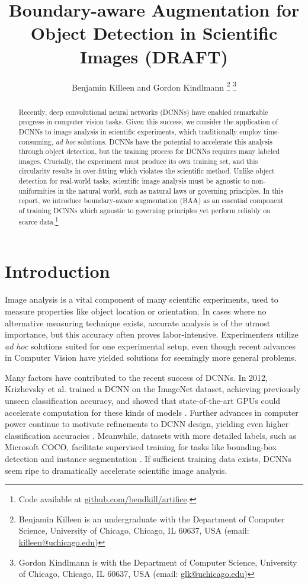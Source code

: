\documentclass[10pt, journal]{IEEEtran}
\title{Boundary-aware Augmentation for Object Detection in Scientific Images
  (DRAFT)}
\author{Benjamin Killeen and Gordon Kindlmann %
  \thanks{Benjamin Killeen is an undergraduate with the Department of Computer
    Science, University of Chicago, Chicago, IL 60637, USA (email:
    \href{mailto:killeen@uchicago.edu}{killeen@uchicago.edu})} %
  \thanks{Gordon Kindlmann is with the Department of Computer Science, 
    University of Chicago, Chicago, IL 60637, USA (email:
    \href{mailto:glk@uchicago.edu}{glk@uchicago.edu})} %
}
\begin{document}
\maketitle

\begin{abstract}
  Recently, deep convolutional neural networks (DCNNs) have enabled remarkable
  progress in computer vision tasks. Given this success, we consider the
  application of DCNNs to image analysis in scientific experiments, which
  traditionally employ time-consuming, \emph{ad hoc} solutions. DCNNs have the
  potential to accelerate this analysis through object detection, but the
  training process for DCNNs requires many labeled images. Crucially, the
  experiment must produce its own training set, and this circularity results in
  over-fitting which violates the scientific method. Unlike object detection for
  real-world tasks, scientific image analysis must be agnostic to
  non-uniformities in the natural world, such as natural laws or governing
  principles. In this report, we introduce boundary-aware augmentation (BAA) as
  an essential component of training DCNNs which agnostic to governing
  principles yet perform reliably on scarce data.\footnote{Code available at
    \href{https://github.com/bendkill/artifice} {github.com/bendkill/artifice}.}
\end{abstract}

\section{Introduction}
\label{sec:introduction}


Image analysis is a vital component of many scientific experiments, used to
measure properties like object location or orientation. In cases where no
alternative measuring technique exists, accurate analysis is of the utmost
importance, but this accuracy often proves labor-intensive. Experimenters
utilize \emph{ad hoc} solutions suited for one experimental setup, even though
recent advances in Computer Vision have yielded solutions for seemingly more
general problems.

Many factors have contributed to the recent success of DCNNs. In 2012,
Krizhevsky et al. trained a DCNN on the ImageNet dataset, achieving previously
unseen classification accuracy, and showed that state-of-the-art GPUs could
accelerate computation for these kinds of models \cite{krizhevsky_imagenet_2012,
  deng_imagenet:_nodate}. Further advances in computer power continue to
motivate refinements to DCNN design, yielding even higher classification
accuracies \cite{simonyan_very_2014, szegedy_going_2014,
  he_deep_2015}. Meanwhile, datasets with more detailed labels, such as
Microsoft COCO, facilitate supervised training for tasks like bounding-box
detection and instance segmentation \cite{lin_microsoft_2014}. If sufficient
training data exists, DCNNs seem ripe to dramatically accelerate scientific
image analysis.
\end{document}
